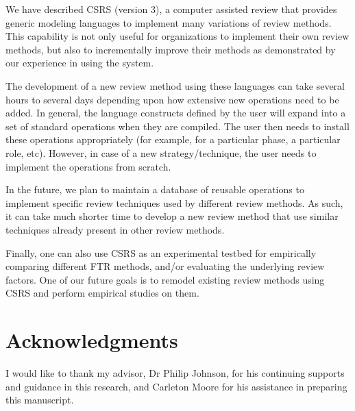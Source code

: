 We have described CSRS (version 3), a computer assisted review that
provides generic modeling languages to implement many variations of
review methods. This capability is not only useful for organizations
to implement their own review methods, but also to incrementally
improve their methods as demonstrated by our experience in using the
system. 

The development of a new review method using these languages 
can take several hours to several days depending upon how extensive new
operations need to be added. 
In general, the language constructs defined by the user will
expand into a set 
of standard operations when they are compiled. The user
then needs to install these operations appropriately (for example, for
a particular phase, a particular role, etc). However, in case
of a new strategy/technique, the user needs to implement the
operations from scratch.

In the future, we plan to maintain a database of reusable operations
to implement specific review techniques used by different review
methods. As such, it can take much shorter 
time to develop a new review method that use similar techniques
already present in other review methods.

Finally, one can also use CSRS as an experimental testbed for
empirically comparing different FTR methods, and/or evaluating the
underlying review factors. One of our future goals is to remodel
existing review methods using CSRS and perform empirical studies on
them. 


\section{Acknowledgments}

I would like to thank my advisor, Dr Philip Johnson, for his
continuing supports and guidance in this research,
and Carleton Moore for his assistance in preparing this manuscript.











